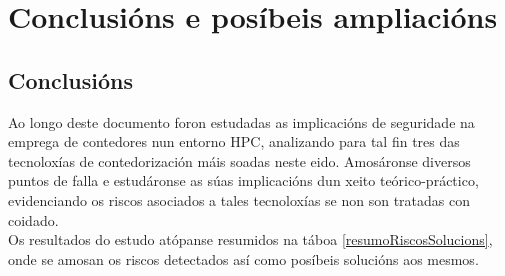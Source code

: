 \chapter{Conclusións e posíbeis ampliacións}
\minitoc
\clearpage

\section{Conclusións}

Ao longo deste documento foron estudadas as implicacións de seguridade na emprega de contedores nun entorno \gls{HPC}, analizando para tal fin tres das tecnoloxías de contedorización máis soadas neste eido. Amosáronse diversos puntos de falla e estudáronse as súas implicacións dun xeito teórico-práctico, evidenciando os riscos asociados a tales tecnoloxías se non son tratadas con coidado.\\

Os resultados do estudo atópanse resumidos na táboa \ref{resumoRiscosSolucions}, onde se amosan os riscos detectados así como posíbeis solucións aos mesmos. \\

